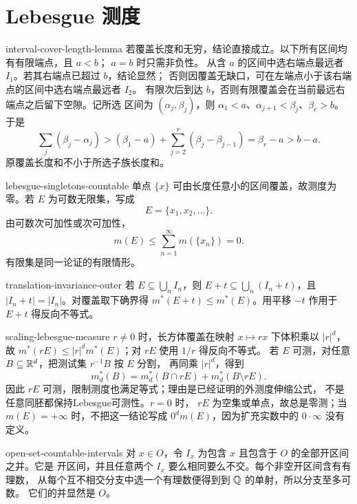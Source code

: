 \chapter{Lebesgue 测度}

\begin{solution}{interval-cover-length-lemma}
若覆盖长度和无穷，结论直接成立。以下所有区间均有有限端点，且 $a<b$；
$a=b$ 时只需非负性。
从含 $a$ 的区间中选右端点最远者 $I_1$。若其右端点已超过 $b$，结论显然；
否则因覆盖无缺口，可在左端点小于该右端点的区间中选右端点最远者 $I_2$。
有限次后到达 $b$，否则有限覆盖会在当前最远右端点之后留下空隙。记所选
区间为 $(\alpha_j,\beta_j)$，则
$\alpha_1<a$、$\alpha_{j+1}<\beta_j$、$\beta_r>b$。于是
\[
 \sum_j(\beta_j-\alpha_j)
 > (\beta_1-a)+\sum_{j=2}^r(\beta_j-\beta_{j-1})
 =\beta_r-a>b-a.
\]
原覆盖长度和不小于所选子族长度和。
\end{solution}

\begin{solution}{lebesgue-singletons-countable}
单点 $\{x\}$ 可由长度任意小的区间覆盖，故测度为零。若 $E$ 为可数无限集，写成
\[
 E=\{x_1,x_2,\ldots\}.
\]
由可数次可加性或次可加性，
\[
 m(E)\le\sum_{n=1}^{\infty}m(\{x_n\})=0.
\]
有限集是同一论证的有限情形。
\end{solution}

\begin{solution}{translation-invariance-outer}
若 $E\subseteq\bigcup_nI_n$，则
$E+t\subseteq\bigcup_n(I_n+t)$，且 $|I_n+t|=|I_n|$。对覆盖取下确界得
$m^*(E+t)\le m^*(E)$。用平移 $-t$ 作用于 $E+t$ 得反向不等式。
\end{solution}

\begin{solution}{scaling-lebesgue-measure}
$r\ne0$ 时，长方体覆盖在映射 $x\mapsto rx$ 下体积乘以 $|r|^d$，故
$m^*(rE)\le|r|^dm^*(E)$；对 $rE$ 使用 $1/r$ 得反向不等式。
若 $E$ 可测，对任意 $B\subseteq\mathbb{R}^d$，把测试集 $r^{-1}B$ 按 $E$ 分割，
再同乘 $|r|^d$，得到
\[
 m_d^*(B)=m_d^*(B\cap rE)+m_d^*(B\setminus rE).
\]
因此 $rE$ 可测，限制测度也满足等式；理由是已经证明的外测度伸缩公式，
不是任意同胚都保持Lebesgue可测性。$r=0$ 时，
$rE$ 为空集或单点，故总是零测；当 $m(E)=+\infty$ 时，不把这一结论写成
$0^dm(E)$，因为扩充实数中的 $0\cdot\infty$ 没有定义。
\end{solution}

\begin{solution}{open-set-countable-intervals}
对 $x\in O$，令 $I_x$ 为包含 $x$ 且包含于 $O$ 的全部开区间之并。它是
开区间，并且任意两个 $I_x$ 要么相同要么不交。每个非空开区间含有有理数，
从每个互不相交分支中选一个有理数便得到到 $\mathbb{Q}$ 的单射，所以分支至多可数。
它们的并显然是 $O$。
\end{solution}

